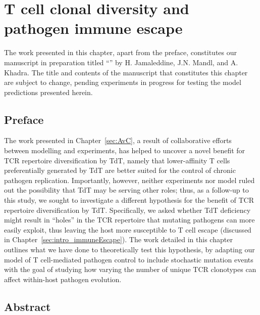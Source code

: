 \chapter{T cell clonal diversity and pathogen immune escape}
\label{sec:VE}

The work presented in this chapter, apart from the preface, constitutes our manuscript in preparation titled ``'' by H. Jamaleddine, J.N. Mandl, and A. Khadra. The title and contents of the manuscript that constitutes this chapter are subject to change, pending experiments in progress for testing the model predictions presented herein.


\section*{Preface}

The work presented in Chapter~\ref{sec:AvC}, a result of collaborative efforts between modelling and experiments, has helped to uncover a novel benefit for TCR repertoire diversification by TdT, namely that lower-affinity T cells preferentially generated by TdT are better suited for the control of chronic pathogen replication. Importantly, however, neither experiments nor model ruled out the possibility that TdT may be serving other roles; thus, as a follow-up to this study, we sought to investigate a different hypothesis for the benefit of TCR repertoire diversification by TdT. Specifically, we asked whether TdT deficiency might result in ``holes'' in the TCR repertoire that mutating pathogens can more easily exploit, thus leaving the host more susceptible to T cell escape (discussed in Chapter~\ref{sec:intro_immuneEscape}). The work detailed in this chapter outlines what we have done to theoretically test this hypothesis, by adapting our model of T cell-mediated pathogen control to include stochastic mutation events with the goal of studying how varying the number of unique TCR clonotypes can affect within-host pathogen evolution.

\newpage
\section{Abstract}

